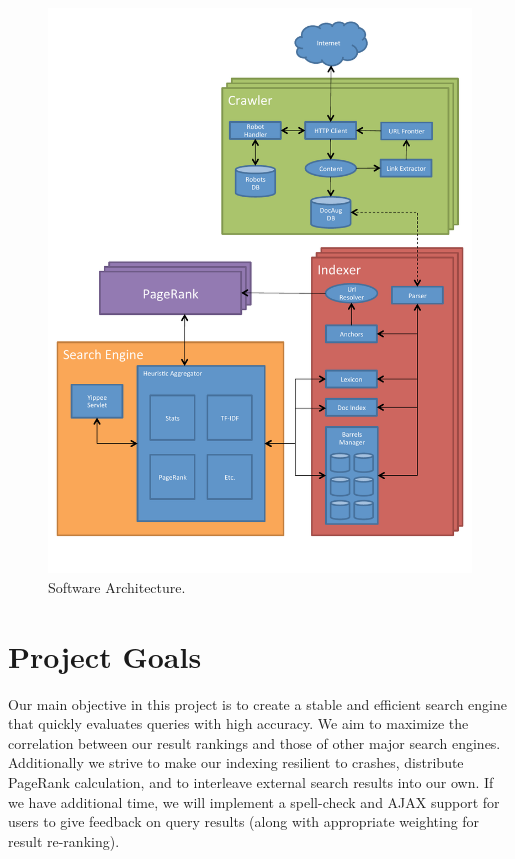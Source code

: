 \documentclass[11pt, letterpaper, oneside, twocolumn]{article}
\begin{document}
\label{sec:SOAR} %
\begin{figure}[!b]
  \centering
  \includegraphics[scale=0.50]{figures/yippee_map.pdf}
  \caption{Software Architecture.}
\end{figure}



\section{ Project Goals }

Our main objective in this project is to create a stable and efficient search engine that quickly evaluates queries with high accuracy. We aim to maximize the correlation between our result rankings and those of other major search engines. Additionally we strive to make our indexing resilient to crashes, distribute PageRank calculation, and to interleave external search results into our own. If we have additional time, we will implement a spell-check and AJAX support for users to give feedback on query results (along with appropriate weighting for result re-ranking).
\end{document}
